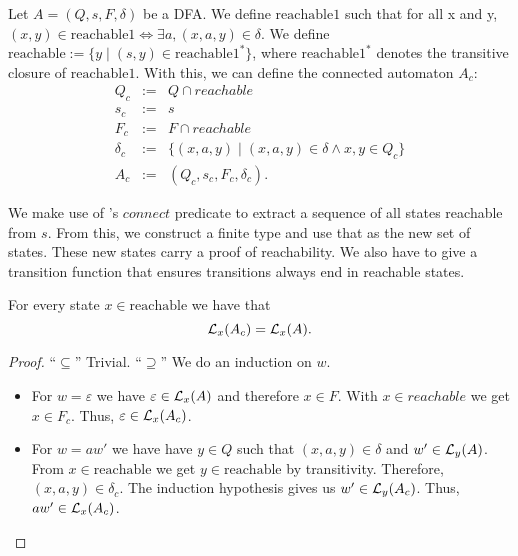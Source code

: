 \begin{definition}
    \label{A_c}
    Let $A = (Q, s, F, \delta)$ be a DFA.
    We define $\mathrm{reachable1}$ such that for all x and y, 
    $(x,y) \in \mathrm{reachable1} \iff \exists a, (x,a,y) \in \delta$.
    We define $\mathrm{reachable} := \{y \; | \; (s,y) \in \mathrm{reachable1}^*\}$, 
    where $\mathrm{reachable1}^*$ denotes the transitive closure of $\mathrm{reachable1}$.
    With this, we can define the connected automaton $A_c$:
    \begin{eqnarray*}
        Q_c & := & Q \cap reachable \\
        s_c & := & s \\
        F_c & := & F \cap reachable \\
        \delta_c & := & \{(x, a, y) \; | \; (x, a, y) \in \delta \wedge x,y \in Q_c \} \\
        A_c &:=& (Q_c, s_c, F_c, \delta_c).
    \end{eqnarray*}
\end{definition}


We make use of \ssreflect's $connect$ predicate to extract a sequence of all states reachable from $s$. 
From this, we construct a finite type and use that as the new set of states. 
These new states carry a proof of reachability. %
We also have to give a transition function that ensures transitions always end in reachable states.



\begin{lemma}
    \label{dfa_connected_correct'}
    For every state $x \in \mathrm{reachable}$ we have that
    \begin{equation*}
        \mathcal{L}_{x}(A_c) = \mathcal{L}_{x}(A).
    \end{equation*}
\end{lemma}
\begin{proof}
    ``$\subseteq$'' Trivial.
    ``$\supseteq$''
    We do an induction on $w$.
    \begin{itemize}
        \item
            For $w = \varepsilon$ we have $\varepsilon \in \mathcal{L}_{x}(A)$ and therefore $x \in F$. 
            With $x \in reachable$ we get $x \in F_c$. 
            Thus, $\varepsilon \in \mathcal{L}_{x}(A_c)$.
        \item
            For $w = a w'$ we have have $y \in Q$ such that $(x, a, y) \in \delta$ and $w' \in \mathcal{L}_{y}(A)$.
            From $x \in \mathrm{reachable}$ we get $y \in \mathrm{reachable}$ by transitivity.
            Therefore, $(x,a,y) \in \delta_c$.
            The induction hypothesis gives us $w' \in \mathcal{L}_{y}(A_c)$. 
            Thus, $a w' \in \mathcal{L}_{x}(A_c)$.
    \end{itemize}
\end{proof}


